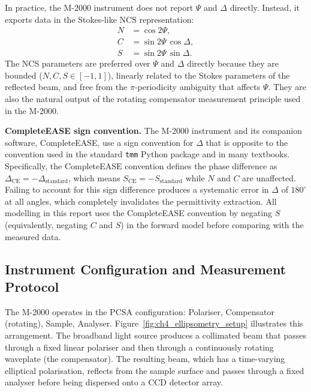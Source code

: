 In practice, the M-2000 instrument does not report $\Psi$ and $\Delta$
directly. Instead, it exports data in the Stokes-like NCS representation:
\begin{align}
  N &= \cos 2\Psi, \label{eq:ch4_N} \\
  C &= \sin 2\Psi\,\cos\Delta, \label{eq:ch4_C} \\
  S &= \sin 2\Psi\,\sin\Delta. \label{eq:ch4_S}
\end{align}
The NCS parameters are preferred over $\Psi$ and $\Delta$ directly because they
are bounded ($N, C, S \in [-1, 1]$), linearly related to the Stokes parameters
of the reflected beam, and free from the $\pi$-periodicity ambiguity that
affects $\Psi$. They are also the natural output of the rotating compensator
measurement principle used in the M-2000.

\begin{warnbox}
\textbf{CompleteEASE sign convention.} The M-2000 instrument and its
companion software, CompleteEASE, use a sign convention for $\Delta$ that is
opposite to the convention used in the standard \texttt{tmm} Python package
and in many textbooks. Specifically, the CompleteEASE convention defines the
phase difference as $\Delta_\text{CE} = -\Delta_\text{standard}$, which means
$S_\text{CE} = -S_\text{standard}$ while $N$ and $C$ are unaffected. Failing
to account for this sign difference produces a systematic error in $\Delta$ of
$180^\circ$ at all angles, which completely invalidates the permittivity
extraction. All modelling in this report uses the CompleteEASE convention
by negating $S$ (equivalently, negating $C$ and $S$) in the forward model
before comparing with the measured data.
\end{warnbox}

\subsection{Instrument Configuration and Measurement Protocol}

The M-2000 operates in the PCSA configuration: Polariser, Compensator (rotating),
Sample, Analyser. Figure~\ref{fig:ch4_ellipsometry_setup} illustrates this
arrangement. The broadband light source produces a collimated beam that passes
through a fixed linear polariser and then through a continuously rotating
waveplate (the compensator). The resulting beam, which has a time-varying
elliptical polarisation, reflects from the sample surface and passes through a
fixed analyser before being dispersed onto a CCD detector array.

